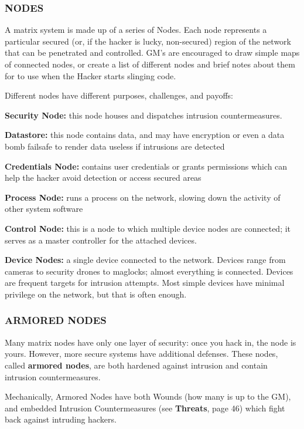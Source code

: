 \documentclass[oneside,10pt]{article}
\begin{document}
\begin{multicols}{2}
  \subsubsection{NODES}
  A matrix system is made up of a series of Nodes. Each node
  represents a particular secured (or, if the hacker is lucky,
  non-secured) region of the network that can be penetrated and
  controlled. GM’s are encouraged to draw simple maps of connected
  nodes, or create a list of different nodes and brief notes about
  them for to use when the Hacker starts slinging code.

  Different nodes have different purposes, challenges, and payoffs:
  \begin{dent}
    \textbf{Security Node:} this node houses and dispatches intrusion
    countermeasures.

    \textbf{Datastore:} this node contains data, and may have
    encryption or even a data bomb failsafe to render data useless if
    intrusions are detected

    \textbf{Credentials Node:} contains user credentials or grants
    permissions which can help the hacker avoid detection or access
    secured areas

    \textbf{Process Node:} runs a process on the network, slowing down
    the activity of other system software

    \textbf{Control Node:} this is a node to which multiple device
    nodes are connected; it serves as a master controller for the
    attached devices.

    \textbf{Device Nodes:} a single device connected to the network.
    Devices range from cameras to security drones to maglocks; almost
    everything is connected. Devices are frequent targets for
    intrusion attempts. Most simple devices have minimal privilege on
    the network, but that is often enough.
  \end{dent}

  \subsubsection{ARMORED NODES}
  Many matrix nodes have only one layer of security: once you hack in,
  the node is yours. However, more secure systems have additional
  defenses. These nodes, called \textbf{armored nodes}, are both
  hardened against intrusion and contain intrusion countermeasures.

  Mechanically, Armored Nodes have both Wounds (how many is up to the
  GM), and embedded Intrusion Countermeasures (see \textbf{Threats},
  page 46) which fight back against intruding hackers.


\end{multicols}
\end{document}
